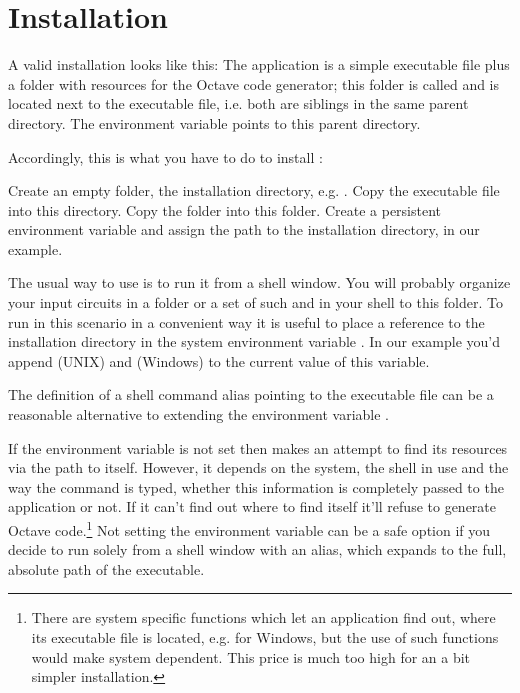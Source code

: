 \chapter{Installation}

A valid installation looks like this: The \linnet{} application is a
simple executable file plus a folder with resources for the Octave code
generator; this folder is called  and is located next to the
\linnet{} executable file, i.e. both are siblings in the same parent
directory. The environment variable  points to this
parent directory.

Accordingly, this is what you have to do to install \linnet{}: 

Create an empty folder, the installation directory, e.g.
. Copy the \linnet{} executable file into this
directory. Copy the folder  into this folder. Create a
persistent environment variable  and assign the path to
the installation directory,  in our example.

The usual way to use \linnet{} is to run it from a shell window. You will
probably organize your input circuits in a folder or a set of such and
 in your shell to this folder. To run \linnet{} in this scenario
in a convenient way it is useful to place a reference to the installation
directory in the system environment variable . In our example
you'd append  (UNIX) and
 (Windows) to the current value of
this variable.

The definition of a shell command alias pointing to the \linnet{}
executable file can be a reasonable alternative to extending the
environment variable .

If the environment variable is not set then \linnet{} makes an attempt to
find its resources via the path to itself. However, it depends on the
system, the shell in use and the way the command is typed, whether this
information is completely passed to the application or not. If it can't
find out where to find itself it'll refuse to generate Octave
code.\footnote{There are system specific functions which let an
application find out, where its executable file is located, e.g.
 for Windows, but the use of such functions would
make \linnet{} system dependent. This price is much too high for an a bit
simpler installation.} Not setting the environment variable can be a safe
option if you decide to run \linnet{} solely from a shell window with an
alias, which expands to the full, absolute path of the executable.


